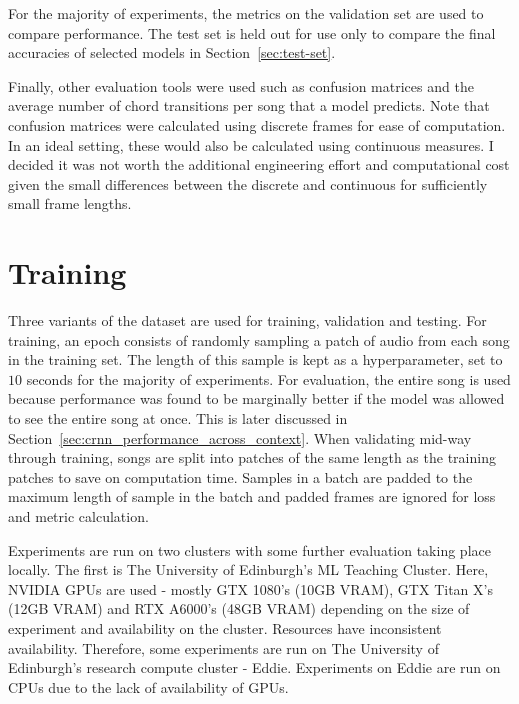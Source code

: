 For the majority of experiments, the metrics on the validation set are used to compare performance. The test set is held out for use only to compare the final accuracies of selected models in Section~\ref{sec:test-set}.

Finally, other evaluation tools were used such as confusion matrices and the average number of chord transitions per song that a model predicts. Note that confusion matrices were calculated using discrete frames for ease of computation. In an ideal setting, these would also be calculated using continuous measures. I decided it was not worth the additional engineering effort and computational cost given the small differences between the discrete and continuous for sufficiently small frame lengths.

\section{Training}\label{sec:training}

Three variants of the dataset are used for training, validation and testing. For training, an epoch consists of randomly sampling a patch of audio from each song in the training set. The length of this sample is kept as a hyperparameter, set to $10$ seconds for the majority of experiments. For evaluation, the entire song is used because performance was found to be marginally better if the model was allowed to see the entire song at once. This is later discussed in Section~\ref{sec:crnn_performance_across_context}. When validating mid-way through training, songs are split into patches of the same length as the training patches to save on computation time. Samples in a batch are padded to the maximum length of sample in the batch and padded frames are ignored for loss and metric calculation.

Experiments are run on two clusters with some further evaluation taking place locally. The first is The University of Edinburgh's ML Teaching Cluster. Here, NVIDIA GPUs are used - mostly GTX 1080's (10GB VRAM), GTX Titan X's (12GB VRAM) and RTX A6000's (48GB VRAM) depending on the size of experiment and availability on the cluster. Resources have inconsistent availability. Therefore, some experiments are run on The University of Edinburgh's research compute cluster - Eddie. Experiments on Eddie are run on CPUs due to the lack of availability of GPUs. 

